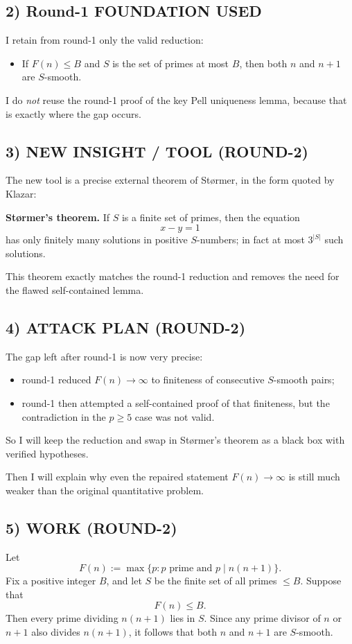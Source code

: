 \subsection*{2) Round-1 FOUNDATION USED}
I retain from round-1 only the valid reduction:
\begin{itemize}
\item If $F(n)\le B$ and $S$ is the set of primes at most $B$, then both $n$ and $n+1$ are $S$-smooth.
\end{itemize}
I do \emph{not} reuse the round-1 proof of the key Pell uniqueness lemma, because that is exactly where the gap occurs.

\subsection*{3) NEW INSIGHT / TOOL (ROUND-2)}
The new tool is a precise external theorem of St\o rmer, in the form quoted by Klazar:

\medskip
\noindent
\textbf{St\o rmer's theorem.} If $S$ is a finite set of primes, then the equation
\[
x-y=1
\]
has only finitely many solutions in positive $S$-numbers; in fact at most $3^{|S|}$ such solutions.
\medskip

This theorem exactly matches the round-1 reduction and removes the need for the flawed self-contained lemma.

\subsection*{4) ATTACK PLAN (ROUND-2)}
The gap left after round-1 is now very precise:
\begin{itemize}
\item round-1 reduced $F(n)\to\infty$ to finiteness of consecutive $S$-smooth pairs;
\item round-1 then attempted a self-contained proof of that finiteness, but the contradiction in the $p\ge 5$ case was not valid.
\end{itemize}
So I will keep the reduction and swap in St\o rmer's theorem as a black box with verified hypotheses.

Then I will explain why even the repaired statement $F(n)\to\infty$ is still much weaker than the original quantitative problem.

\subsection*{5) WORK (ROUND-2)}
Let
\[
F(n):=\max\{p : p\mbox{ prime and } p\mid n(n+1)\}.
\]
Fix a positive integer $B$, and let $S$ be the finite set of all primes $\le B$.
Suppose that
\[
F(n)\le B.
\]
Then every prime dividing $n(n+1)$ lies in $S$. Since any prime divisor of $n$ or $n+1$ also divides $n(n+1)$, it follows that both $n$ and $n+1$ are $S$-smooth.

